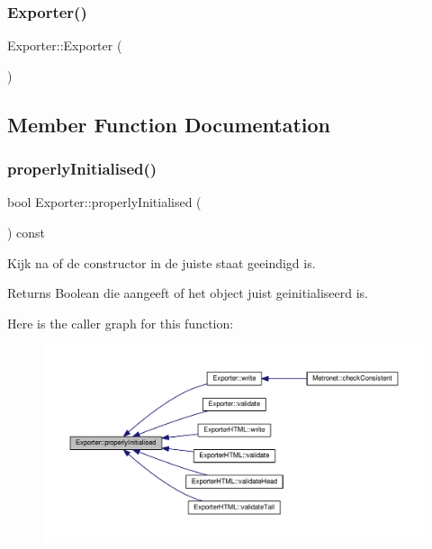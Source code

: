 \subsubsection{\texorpdfstring{Exporter()}{Exporter()}}
{\footnotesize\ttfamily Exporter\+::\+Exporter (\begin{DoxyParamCaption}{ }\end{DoxyParamCaption})}



\subsection{Member Function Documentation}
\mbox{\label{class_exporter_aafd9df9210aeefd7bb7fd434fc317cf0}} 
\subsubsection{\texorpdfstring{properly\+Initialised()}{properlyInitialised()}}
{\footnotesize\ttfamily bool Exporter\+::properly\+Initialised (\begin{DoxyParamCaption}{ }\end{DoxyParamCaption}) const\hspace{0.3cm}{\ttfamily [virtual]}}



Kijk na of de constructor in de juiste staat geeindigd is. 

\begin{DoxyReturn}{Returns}
Boolean die aangeeft of het object juist geinitialiseerd is. 
\end{DoxyReturn}
Here is the caller graph for this function\+:
\nopagebreak
\begin{figure}[H]
\begin{center}
\leavevmode
\includegraphics[width=350pt]{class_exporter_aafd9df9210aeefd7bb7fd434fc317cf0_icgraph}
\end{center}
\end{figure}
\mbox{\label{class_exporter_a6fe3b356471d7f77502b511b5179a4a8}} 
